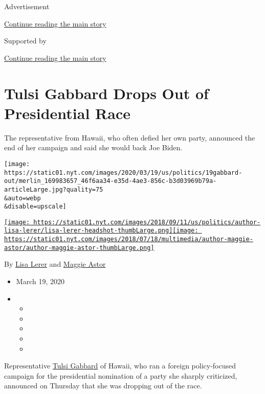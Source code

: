 Advertisement

\protect\hyperlink{after-top}{Continue reading the main story}

Supported by

\protect\hyperlink{after-sponsor}{Continue reading the main story}

\hypertarget{tulsi-gabbard-drops-out-of-presidential-race}{%
\section{Tulsi Gabbard Drops Out of Presidential
Race}\label{tulsi-gabbard-drops-out-of-presidential-race}}

The representative from Hawaii, who often defied her own party,
announced the end of her campaign and said she would back Joe Biden.

\texttt{[image: https://static01.nyt.com/images/2020/03/19/us/politics/19gabbard-out/merlin\_169983657\_46f6aa34-e35d-4ae3-856c-b3d03969b79a-articleLarge.jpg?quality=75\\\&auto=webp\\\&disable=upscale]}

\href{https://www.nytimes.com/by/lisa-lerer}{\texttt{[image: https://static01.nyt.com/images/2018/09/11/us/politics/author-lisa-lerer/lisa-lerer-headshot-thumbLarge.png]}}\href{https://www.nytimes.com/by/maggie-astor}{\texttt{[image: https://static01.nyt.com/images/2018/07/18/multimedia/author-maggie-astor/author-maggie-astor-thumbLarge.png]}}

By \href{https://www.nytimes.com/by/lisa-lerer}{Lisa Lerer} and
\href{https://www.nytimes.com/by/maggie-astor}{Maggie Astor}

\begin{itemize}
\item
  March 19, 2020
\item
  \begin{itemize}
  \item
  \item
  \item
  \item
  \item
  \end{itemize}
\end{itemize}

Representative
\href{https://www.nytimes.com/interactive/2020/us/elections/tulsi-gabbard.html}{Tulsi
Gabbard} of Hawaii, who ran a foreign policy-focused campaign for the
presidential nomination of a party she sharply criticized, announced on
Thursday that she was dropping out of the race.

